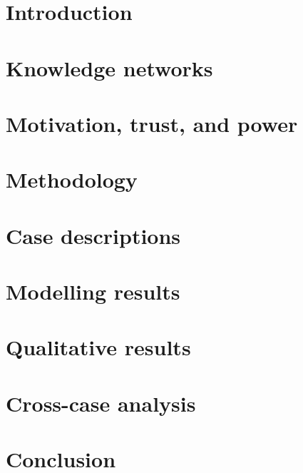 \documentclass[12pt,table]{book}
\renewcommand{\bibname}{References}
\begin{document}
\newpage
\setcounter{tocdepth}{3}
\tableofcontents

\newpage

\listoffigures

\newpage

\listoftables

\mainmatter

\chapter{Introduction}


\chapter{Knowledge networks}


\chapter{Motivation, trust, and power}


\chapter{Methodology}


\chapter{Case descriptions}


\chapter{Modelling results}

%
\chapter{Qualitative results}

%
\chapter{Cross-case analysis}

%
\chapter{Conclusion}


\backmatter
\pagebreak

% 
\renewcommand{\bibname}{References}

%
\end{document}
